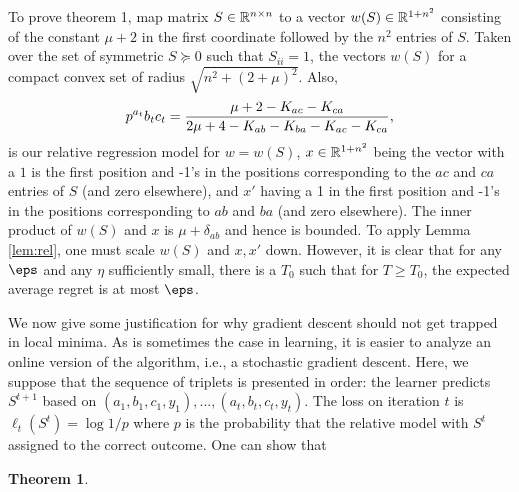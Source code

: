 \documentclass{article}
\newtheorem{theorem}{Theorem}
\begin{document}
To prove theorem 1, map matrix $S\in \reals^{n \times n}$ to a vector $w(S)\in\reals^{1+n^2}$ consisting of the constant $\mu+2$ in the first coordinate followed by the $n^2$ entries of $S$.  Taken over the set of symmetric $S \succeq 0$ such that $S_{ii}=1$, the vectors $w(S)$ for a compact convex set of radius $\sqrt{n^2+(2+\mu)^2}$.  Also,
$$p^{a_t}{b_tc_t}=\frac{\mu + 2-\S_{ac}-\S_{ca}}{2\mu + 4-\S_{ab}-\S_{ba}-\S_{ac}-\S_{ca}},$$
is our relative regression model for $w=w(S)$, $x\in\reals^{1+n^2}$ being the vector with a $1$ is the first position and -1's in the positions corresponding to the $ac$ and $ca$ entries of $S$ (and zero elsewhere), and $x'$ having a 1 in the first position and -1's in the positions corresponding to $ab$ and $ba$ (and zero elsewhere).  The inner product of $w(S)$ and $x$ is $\mu+\delta_{ab}$ and hence is bounded.  
To apply Lemma \ref{lem:rel}, one must scale $w(S)$ and $x,x'$ down.  However, it is clear that for any $\eps$ and any $\eta$ sufficiently small, there is a $T_0$ such that for $T\geq T_0$, the expected average regret is at most $\eps$.


We now give some justification for why gradient descent should not get trapped in local minima.  As is sometimes the case in learning, it is easier to analyze an online version of the algorithm, i.e., a stochastic gradient descent.  Here, we suppose that the sequence of triplets is presented in order: the learner predicts $S^{t+1}$ based on $(a_1,b_1,c_1,y_1),\ldots,(a_t,b_t,c_t,y_t)$.  The loss on iteration $t$ is $\ell_t(S^t)=\log 1/p$ where $p$ is the probability that the relative model with $S^t$ assigned to the correct outcome.  One can show that
\begin{theorem}

\end{theorem}




\end{document}
